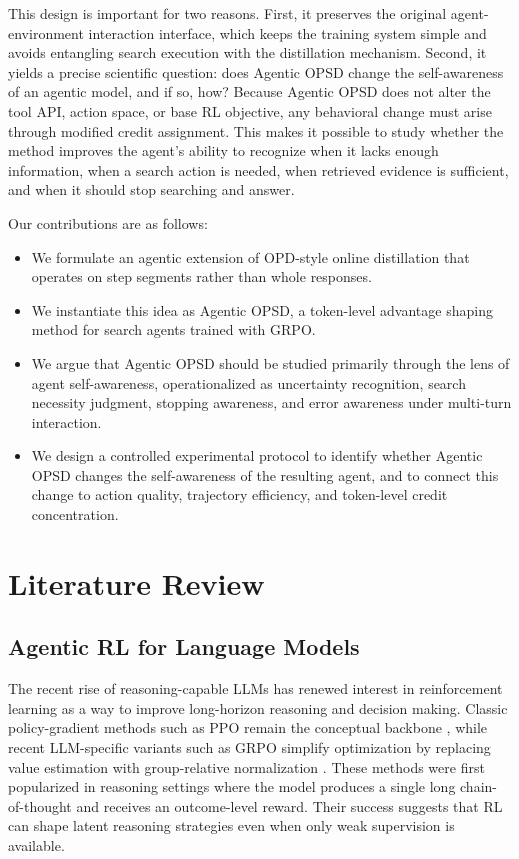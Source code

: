 \documentclass[11pt]{article}
\newcommand{\method}{Agentic OPSD}
\newcommand{\grpo}{GRPO}
\newcommand{\ppo}{PPO}
\begin{document}
This design is important for two reasons. First, it preserves the original agent-environment interaction interface, which keeps the training system simple and avoids entangling search execution with the distillation mechanism. Second, it yields a precise scientific question: does Agentic OPSD change the self-awareness of an agentic model, and if so, how? Because \method{} does not alter the tool API, action space, or base RL objective, any behavioral change must arise through modified credit assignment. This makes it possible to study whether the method improves the agent's ability to recognize when it lacks enough information, when a search action is needed, when retrieved evidence is sufficient, and when it should stop searching and answer.

Our contributions are as follows:
\begin{itemize}[leftmargin=1.5em]
    \item We formulate an agentic extension of OPD-style online distillation that operates on step segments rather than whole responses.
    \item We instantiate this idea as \method{}, a token-level advantage shaping method for search agents trained with \grpo{}.
    \item We argue that \method{} should be studied primarily through the lens of agent self-awareness, operationalized as uncertainty recognition, search necessity judgment, stopping awareness, and error awareness under multi-turn interaction.
    \item We design a controlled experimental protocol to identify whether \method{} changes the self-awareness of the resulting agent, and to connect this change to action quality, trajectory efficiency, and token-level credit concentration.
\end{itemize}

\section{Literature Review}
\subsection{Agentic RL for Language Models}
The recent rise of reasoning-capable LLMs has renewed interest in reinforcement learning as a way to improve long-horizon reasoning and decision making. Classic policy-gradient methods such as \ppo{} remain the conceptual backbone \citep{schulman2017ppo}, while recent LLM-specific variants such as \grpo{} simplify optimization by replacing value estimation with group-relative normalization \citep{deepseekr1}. These methods were first popularized in reasoning settings where the model produces a single long chain-of-thought and receives an outcome-level reward. Their success suggests that RL can shape latent reasoning strategies even when only weak supervision is available.
\end{document}
